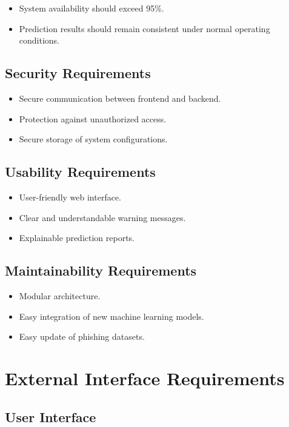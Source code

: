 \documentclass[12pt]{report}
\begin{document}
\begin{itemize}
    \item System availability should exceed 95\%.
    \item Prediction results should remain consistent under normal operating conditions.
\end{itemize}

\subsection{Security Requirements}

\begin{itemize}
    \item Secure communication between frontend and backend.
    \item Protection against unauthorized access.
    \item Secure storage of system configurations.
\end{itemize}

\subsection{Usability Requirements}

\begin{itemize}
    \item User-friendly web interface.
    \item Clear and understandable warning messages.
    \item Explainable prediction reports.
\end{itemize}

\subsection{Maintainability Requirements}

\begin{itemize}
    \item Modular architecture.
    \item Easy integration of new machine learning models.
    \item Easy update of phishing datasets.
\end{itemize}

\section{External Interface Requirements}

\subsection{User Interface}
\end{document}
